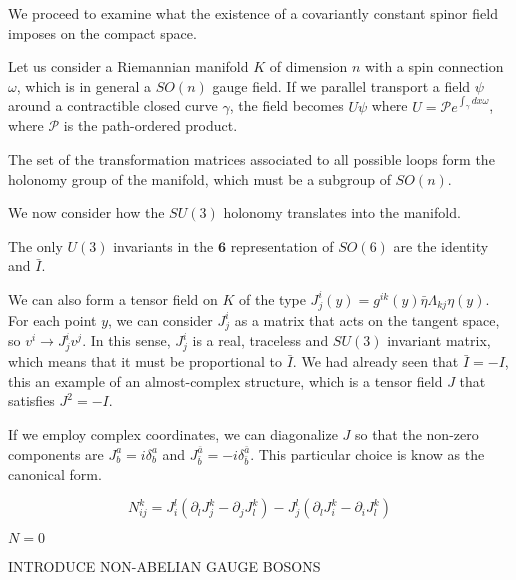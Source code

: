 We proceed to examine what the existence of a covariantly constant spinor field imposes on the compact space. 

Let us consider a Riemannian manifold $K$ of dimension $n$ with a spin connection $\omega$, which 
is in general a $SO(n)$ gauge field.
If we parallel transport a field $\psi$ around a contractible closed curve $\gamma$, the field becomes
$U\psi$ where $U=\mathcal P e^{\int_\gamma dx \omega}$, where $\mathcal P$ is the path-ordered product.

The set of the transformation matrices associated to all possible loops form the holonomy group of the manifold, 
which must be a subgroup of $SO(n)$.


We now consider how the $SU(3)$ holonomy translates into the manifold. 


The only  $U(3)$ invariants in the $\mathbf{6}$ representation of $SO(6)$ are the identity and
$\bar I$.

We can also form a tensor field on $K$ of the type $J^i_j(y)=g^{ik}(y) \bar\eta \Lambda_{kj} \eta(y)$.
For each point $y$, we can consider $J^i_j$ as a matrix that acts on the tangent space, so $v^i \to J^i_j v^j$.
In this sense, $J^i_j$ is a real, traceless and $SU(3)$ invariant matrix, which means that it must be proportional
to $\bar I$.
We had already seen that $\bar I = -I$, this an example of an almost-complex structure, which is 
a tensor field $J$ that satisfies $J^2=-I$.

If we employ complex coordinates, we can diagonalize $J$ so that the non-zero components are
$J^a_b=i\delta^a_b$ and $J^{\bar a}_{\bar b}=-i\delta^{\bar a}_{\bar b}$. This particular choice
is know as the canonical form.



\begin{equation}
  N^k_{ij}= J^l_i(\partial_l J^k_j - \partial_j J^k_l) - J_j^l (\partial_l J^k_i - \partial_i J^k_l)
\end{equation}

$N=0$





INTRODUCE NON-ABELIAN GAUGE BOSONS
